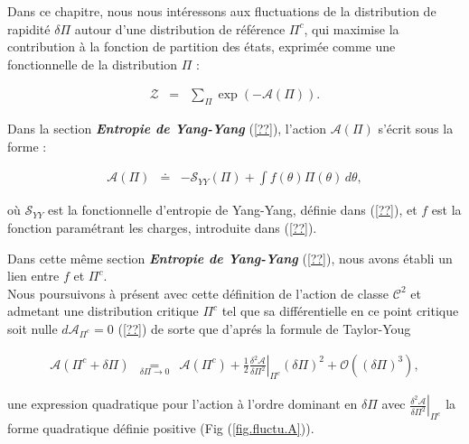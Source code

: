 Dans ce chapitre, nous nous intéressons aux fluctuations de la distribution de rapidité \( \delta \Pi \) autour d'une distribution de référence \( \Pi^c \), qui maximise la contribution à la fonction de partition des états, exprimée comme une fonctionnelle de la distribution \( \Pi \) :  

\begin{eqnarray*}
	\mathcal{Z} & = & \sum_\Pi \exp \left( -\mathcal{A}(\Pi) \right).
\end{eqnarray*}  

Dans la section {\em \bf Entropie de Yang-Yang} (\ref{??}), l'action \( \mathcal{A}(\Pi) \) s'écrit sous la forme :  

\begin{eqnarray*}
	\mathcal{A}(\Pi) & \doteq & - \mathcal{S}_{YY}(\Pi) + \int f(\theta) \Pi (\theta) \, d\theta,		
\end{eqnarray*}  

où \( \mathcal{S}_{YY} \) est la fonctionnelle d'entropie de Yang-Yang, définie dans (\ref{??}), et \( f \) est la fonction paramétrant les charges, introduite dans (\ref{??}).  

Dans cette même section {\em \bf Entropie de Yang-Yang} (\ref{??}), nous avons établi un lien entre \( f \) et \( \Pi^c \).\\
  

Nous poursuivons à présent avec cette définition de l'action de classe $\mathcal{C}^2$ et admetant une distribution critique $\Pi^c$ tel que sa différentielle en ce point critique soit nulle $d\mathcal{A}_{\Pi^c} = 0 $ (\ref{??}) de sorte que d'aprés la formule de Taylor-Youg %

\begin{eqnarray*}  
	\mathcal{A}(\Pi^c + \delta \Pi) & \underset{ \delta \Pi \to 0 }{=} & \mathcal{A}(\Pi^c)  + \frac{1}{2} \left. \frac{\delta^2 \mathcal{A}}{\delta \Pi^2} \right|_{\Pi^c} (\delta \Pi)^2 + \mathcal{O}((\delta \Pi)^3),  
\end{eqnarray*}  

une expression quadratique pour l'action à l'ordre dominant en \( \delta \Pi \) avec $\left. \frac{\delta^2 \mathcal{A}}{\delta \Pi^2} \right|_{\Pi^c}$ la forme quadratique définie positive (Fig (\ref{fig.fluctu.A})).


